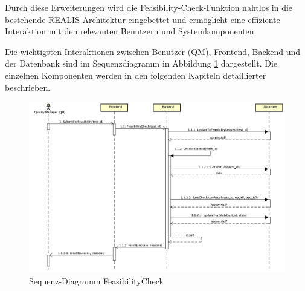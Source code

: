 Durch diese Erweiterungen wird die Feasibility-Check-Funktion nahtlos in die bestehende REALIS-Architektur eingebettet und ermöglicht eine effiziente Interaktion mit den relevanten Benutzern und Systemkomponenten.

Die wichtigsten Interaktionen zwischen Benutzer (\gls{QM}), Frontend, Backend und der Datenbank sind im Sequenzdiagramm in Abbildung \ref{fig:sequence-diagram} dargestellt. Die einzelnen Komponenten werden in den folgenden Kapiteln detaillierter beschrieben. 

\begin{figure}[!htbp]
    \centering
    \includegraphics[width=1\textwidth]{bilder/Sequence-Integration.png}
    \caption{Sequenz-Diagramm FeasibilityCheck}
    \label{fig:sequence-diagram}
\end{figure}



